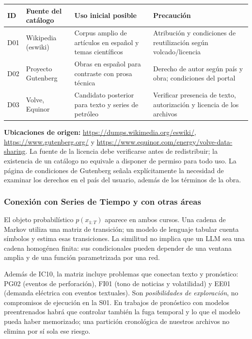 \begin{center}\small
\begin{tabularx}{\linewidth}{@{}p{1.2cm}p{3.3cm}Xp{2.6cm}@{}}\toprule
ID & Fuente del catálogo & Uso inicial posible & Precaución\\\midrule
D01 & Wikipedia (eswiki) & Corpus amplio de artículos en español y temas científicos & Atribución y condiciones de reutilización según volcado/licencia\\
D02 & Proyecto Gutenberg & Obras en español para contraste con prosa técnica & Derecho de autor según país y obra; condiciones del portal\\
D03 & Volve, Equinor & Candidato posterior para texto y series de petróleo & Verificar presencia de texto, autorización y licencia de los archivos\\\bottomrule
\end{tabularx}
\end{center}
\textbf{Ubicaciones de origen:} \url{https://dumps.wikimedia.org/eswiki/},
\url{https://www.gutenberg.org/} y
\url{https://www.equinor.com/energy/volve-data-sharing}.
La fuente de la licencia debe verificarse antes de redistribuir; la existencia
de un catálogo no equivale a disponer de permiso para todo uso. La página de
condiciones de Gutenberg señala explícitamente la necesidad de examinar los
derechos en el país del usuario, además de los términos de la obra.

\subsubsection*{Conexión con Series de Tiempo y con otras áreas}

El objeto probabilístico $p(x_{1:T})$ aparece en ambos cursos. Una cadena de
Markov utiliza una matriz de transición; un modelo de lenguaje tabular cuenta
símbolos y estima esas transiciones. La similitud no implica que un LLM sea una
cadena homogénea finita: sus condicionales pueden depender de una ventana amplia
y de una función parametrizada por una red.

Además de IC10, la matriz incluye problemas que conectan texto y pronóstico:
PG02 (eventos de perforación), FI01 (tono de noticias y volatilidad) y EE01
(demanda eléctrica con eventos textuales). Son \emph{posibilidades de exploración},
no compromisos de ejecución en la S01. En trabajos de pronóstico con modelos
preentrenados habrá que controlar también la fuga temporal y lo que el modelo
pueda haber memorizado; una partición cronológica de nuestros archivos no elimina
por sí sola ese riesgo.

